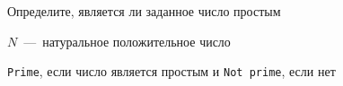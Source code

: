 Определите, является ли заданное число простым

\InputFile

$N$~---~натуральное положительное число

\OutputFile

\texttt{Prime}, если число является простым и \texttt{Not prime}, если нет

\SAMPLES

